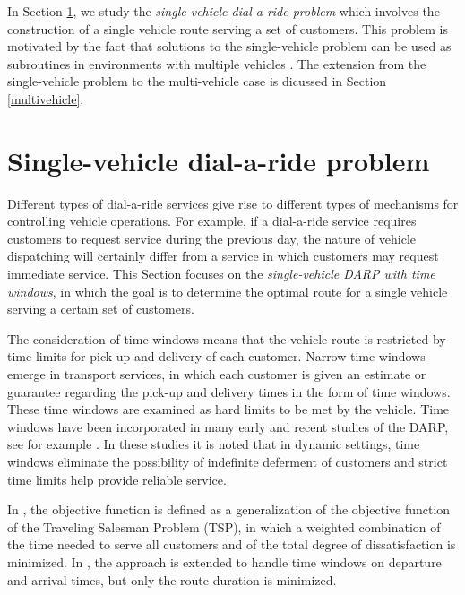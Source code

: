 \documentclass[dissertation,draft*]{aaltoseries}
\begin{document}
In Section \ref{singlevehicle}, we study the \emph{single-vehicle dial-a-ride problem} which involves the construction
of a single vehicle route serving a set of customers. This problem is motivated by the
fact that solutions to the single-vehicle problem can be used as subroutines in environments with 
multiple vehicles \cite{psaraftis01,psaraftis02}. The extension from the single-vehicle problem to the multi-vehicle
case is dicussed in Section \ref{multivehicle}.

\section{Single-vehicle dial-a-ride problem}
\label{singlevehicle}
Different types of dial-a-ride services give rise to
different types of mechanisms for controlling vehicle operations. 
For example, if a dial-a-ride service requires customers to request 
service during the previous day, the nature of vehicle
dispatching will certainly differ from a service in which
customers may request immediate service.
This Section focuses on %
the \emph{single-vehicle DARP with time windows}, in which the goal is to determine the optimal
route for a single vehicle serving a certain set of customers.

The consideration of time windows means that the vehicle route is 
restricted by time limits for pick-up and delivery of each customer.
Narrow time windows emerge in transport services, in which each customer
is given an estimate or guarantee regarding the pick-up and delivery times in the 
form of time windows. These time windows are examined as hard limits to be met by the vehicle.
Time windows have been incorporated in many early and recent studies of the DARP, see for example 
\cite{psaraftis02, jaw, madsen, toth02,cordeau02,diana, wong, cordeau01, berbegliafeas}.
In these studies it is noted that in dynamic settings, time windows eliminate the possibility of indefinite
deferment of customers and strict time limits help provide reliable service.

In \cite{psaraftis01}, the objective function is defined as a
generalization of the objective function of the Traveling Salesman Problem (TSP), 
in which a weighted combination
of the time needed to serve all customers and of the total degree of dissatisfaction
is minimized.
In \cite{psaraftis02}, the approach is extended to handle time windows on departure and arrival times,
but only the route duration is minimized. 
\end{document}
